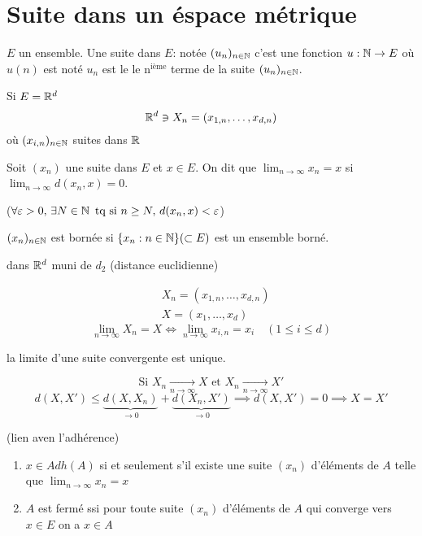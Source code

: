  \section{Suite dans un éspace métrique}
 \begin{definition}
     $E$ un ensemble. Une suite dans $E$: notée $(u_n)_{n \in \mathbb{N}}$ c'est une fonction $u:  \mathbb{N} \to E$ où $u(n)$ est noté  $u_n$ est le le  $\text{n}^{\text{ième}}$ terme de la suite $(u_n)_{n \in \mathbb{N}}$.
     \par
     Si $E = \mathbb{R}^d$
     \[
     \mathbb{R}^d \ni X_n = (x_{1,n}, \ldots, x_{d,n})
     \] 
 où $(x_{i,n})_{n \in \mathbb{N}}$ suites dans $\mathbb{R}$
 \end{definition}
 \begin{definition}
     Soit $(x_n)$ une suite dans  $E$ et  $x \in E$. On dit que  $\lim_{n \to \infty} x_n = x$ si $\lim_{n \to \infty} d(x_n, x) = 0$.
     \par
     ($\forall \varepsilon > 0, \, \exists N \in \mathbb{N} \, \text{ tq si } n \ge N, \, d(x_n, x) < \varepsilon$)
 \end{definition}
 \begin{prop}
     $(x_n)_{n \in \mathbb{N}}$ est bornée si $\{x_n : n \in \mathbb{N}\} (\subset E)$ est un ensemble borné. 
 \end{prop}
 \begin{remark}
    dans $\mathbb{R}^d$ muni de $d_2$ (distance euclidienne)

    \begin{align*}
        &X_n = (x_{1,n}, \ldots, x_{d,n})\\
        &X = (x_1, \ldots, x_d)
    \end{align*}
    \[
    \lim_{n \to \infty} X_n = X \iff \lim_{n \to \infty} x_{i,n} = x_i \quad (1 \le i \le d)
    \] 
 \end{remark}
 \begin{prop}
    la limite d'une suite convergente est unique. 
 \end{prop}
 \begin{preuve}
    \[
    \text{Si } X_n \xrightarrow[n \to \infty]{} X \text{ et } X_n \xrightarrow[n \to \infty]{} X'
    \]  
    \[
        d(X, X') \le \underbrace{d(X, X_n)}_{\to 0} + \underbrace{d(X_n, X')}_{\to 0} \implies d(X, X') = 0 \implies X = X'
    \] 
 \end{preuve}
 \begin{prop}\label{prop:suite-lien-avec-adherence}
     (lien aven l'adhérence) 
     \begin{enumerate}
         \item $x \in Adh(A)$ si et seulement s'il existe une suite  $(x_n)$ d'éléments de  $A$ telle que  $\lim_{n \to \infty} x_n = x$
         \item $A$ est fermé ssi pour toute suite  $(x_n)$ d'éléments de  $A$ qui converge vers $x \in E$ on a $x \in A$
     \end{enumerate}
 \end{prop}
